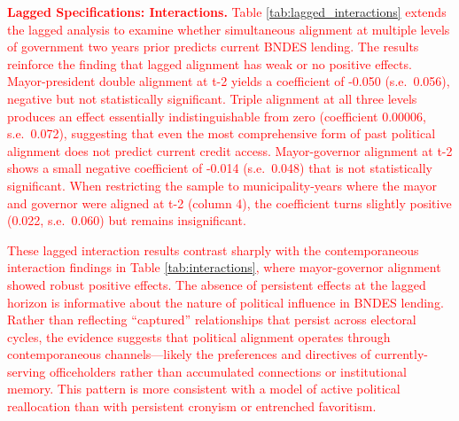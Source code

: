 \documentclass{article}
\begin{document}
\begin{table}[H]
\begin{threeparttable}
\begin{tablenotes}
        \end{tablenotes}
    \end{threeparttable}
\end{table}

\textcolor{red}{\textbf{Lagged Specifications: Interactions.} Table \ref{tab:lagged_interactions} extends the lagged analysis to examine whether simultaneous alignment at multiple levels of government two years prior predicts current BNDES lending. The results reinforce the finding that lagged alignment has weak or no positive effects. Mayor-president double alignment at t-2 yields a coefficient of -0.050 (s.e.~0.056), negative but not statistically significant. Triple alignment at all three levels produces an effect essentially indistinguishable from zero (coefficient 0.00006, s.e.~0.072), suggesting that even the most comprehensive form of past political alignment does not predict current credit access. Mayor-governor alignment at t-2 shows a small negative coefficient of -0.014 (s.e.~0.048) that is not statistically significant. When restricting the sample to municipality-years where the mayor and governor were aligned at t-2 (column 4), the coefficient turns slightly positive (0.022, s.e.~0.060) but remains insignificant.}

\textcolor{red}{These lagged interaction results contrast sharply with the contemporaneous interaction findings in Table \ref{tab:interactions}, where mayor-governor alignment showed robust positive effects. The absence of persistent effects at the lagged horizon is informative about the nature of political influence in BNDES lending. Rather than reflecting ``captured'' relationships that persist across electoral cycles, the evidence suggests that political alignment operates through contemporaneous channels---likely the preferences and directives of currently-serving officeholders rather than accumulated connections or institutional memory. This pattern is more consistent with a model of active political reallocation than with persistent cronyism or entrenched favoritism.}
\end{document}
